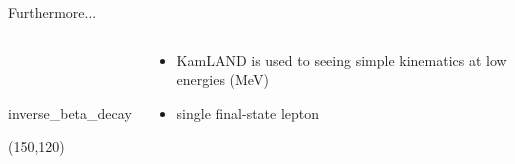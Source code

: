 \documentclass[14pt]{beamer}
\begin{document}
\begin{frame}[fragile]{Furthermore...}
	\centering
	\begin{columns}[T]
		\begin{block}{\\~\\}
			\centering
			\begin{fmffile}{inverse_beta_decay} \begin{fmfgraph*}(150,120)
				 
			\end{fmfgraph*} \end{fmffile}
		\end{block}
		\begin{block}{}
			\begin{itemize}
				\item<2-> KamLAND is used to seeing simple kinematics at low
					energies (\si{\mega\electronvolt})
				\item<3-> single final-state lepton
			\end{itemize}
		\end{block}
	\end{columns}
\end{frame}
\end{document}
